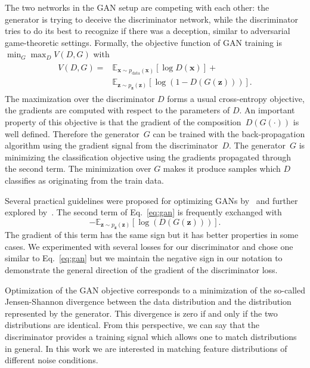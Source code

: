 \documentclass[a4paper]{article}
\begin{document}
    The two networks in the GAN setup are competing with each other: the 
    generator is trying to deceive the discriminator network, while the discriminator tries
    to do its best to recognize if there was a deception, similar to adversarial game-theoretic settings.    
    Formally, the objective function of GAN training is $\min_G \max_D V(D, G)$ with
    \begin{align}
    \begin{split}
        V(D, G) = &\mathbb{E}_{\bm{x} \sim p_{\text{data}}(\bm{x})}[\log D(\bm{x})] + \\
            &\mathbb{E}_{\bm{z} \sim p_{\bm{z}}(\bm{z})}[\log (1 - D(G(\bm{z})))].
    \end{split}
    \label{eq:gan}
    \end{align}
    The maximization over the discriminator $D$ forms a usual cross-entropy objective, the gradients are
    computed with respect to the parameters of $D$. An important property of
    this objective is that the gradient of the composition~$D(G(\cdot))$ is well
    defined. Therefore the generator~$G$ can be trained with the back-propagation
    algorithm using the gradient signal from the discriminator~$D$.
    The generator~$G$ is
    minimizing the classification objective using the gradients
    propagated through the second term. The minimization over $G$ makes it
    produce samples which $D$ classifies as originating from the train data.

    Several practical guidelines were proposed for optimizing GANs by~\cite{radford2015unsupervised} and 
    further explored by~\cite{salimans2016improved}. The second term of Eq.~\ref{eq:gan}
    is frequently exchanged with
    \begin{equation}
        - \mathbb{E}_{\bm{z} \sim p_{\bm{z}}(\bm{z})}[\log (D(G(\bm{z})))].
    \end{equation}
    The gradient of this term has the same sign but it has better properties in
    some cases.
    We experimented with several losses for our discriminator and chose one
    similar to Eq.~\ref{eq:gan} but we maintain the negative sign in our notation
    to demonstrate the general direction of the gradient of the discriminator loss.

    Optimization of the GAN objective corresponds to a minimization of the
    so-called Jensen-Shannon divergence between the data distribution and the
    distribution represented by the generator. This divergence is zero if and
    only if the two distributions are identical. From this perspective, we can
    say that the discriminator provides a training signal which allows
    one to match distributions in general. In this work we are interested in
    matching feature distributions of different noise conditions.
\end{document}
